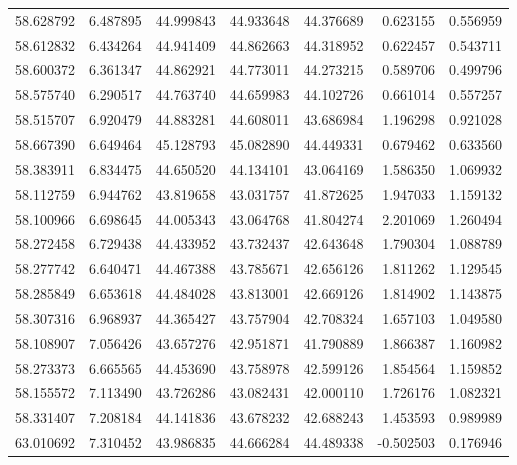 \begin{tabular}{rrrrrrr}
 58.628792 &   6.487895 &         44.999843 &         44.933648 &         44.376689 &  0.623155 &  0.556959 \\
 58.612832 &   6.434264 &         44.941409 &         44.862663 &         44.318952 &  0.622457 &  0.543711 \\
 58.600372 &   6.361347 &         44.862921 &         44.773011 &         44.273215 &  0.589706 &  0.499796 \\
 58.575740 &   6.290517 &         44.763740 &         44.659983 &         44.102726 &  0.661014 &  0.557257 \\
 58.515707 &   6.920479 &         44.883281 &         44.608011 &         43.686984 &  1.196298 &  0.921028 \\
 58.667390 &   6.649464 &         45.128793 &         45.082890 &         44.449331 &  0.679462 &  0.633560 \\
 58.383911 &   6.834475 &         44.650520 &         44.134101 &         43.064169 &  1.586350 &  1.069932 \\
 58.112759 &   6.944762 &         43.819658 &         43.031757 &         41.872625 &  1.947033 &  1.159132 \\
 58.100966 &   6.698645 &         44.005343 &         43.064768 &         41.804274 &  2.201069 &  1.260494 \\
 58.272458 &   6.729438 &         44.433952 &         43.732437 &         42.643648 &  1.790304 &  1.088789 \\
 58.277742 &   6.640471 &         44.467388 &         43.785671 &         42.656126 &  1.811262 &  1.129545 \\
 58.285849 &   6.653618 &         44.484028 &         43.813001 &         42.669126 &  1.814902 &  1.143875 \\
 58.307316 &   6.968937 &         44.365427 &         43.757904 &         42.708324 &  1.657103 &  1.049580 \\
 58.108907 &   7.056426 &         43.657276 &         42.951871 &         41.790889 &  1.866387 &  1.160982 \\
 58.273373 &   6.665565 &         44.453690 &         43.758978 &         42.599126 &  1.854564 &  1.159852 \\
 58.155572 &   7.113490 &         43.726286 &         43.082431 &         42.000110 &  1.726176 &  1.082321 \\
 58.331407 &   7.208184 &         44.141836 &         43.678232 &         42.688243 &  1.453593 &  0.989989 \\
 63.010692 &   7.310452 &         43.986835 &         44.666284 &         44.489338 & -0.502503 &  0.176946 \\

\end{tabular}
